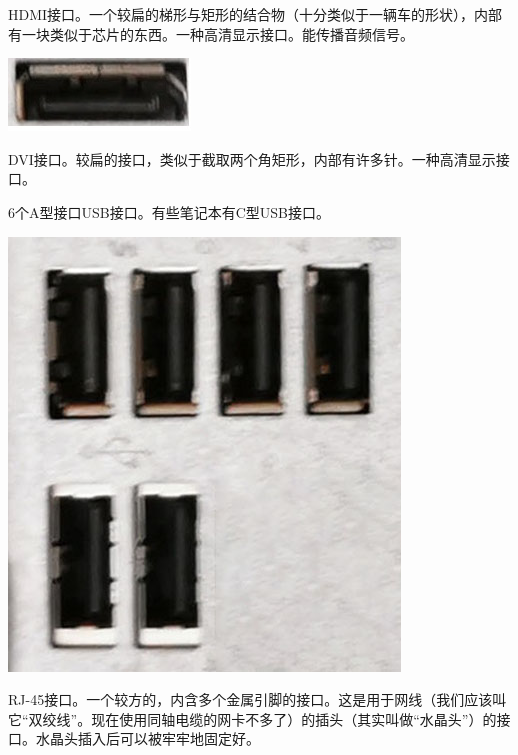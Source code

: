 HDMI接口。一个较扁的梯形与矩形的结合物（十分类似于一辆车的形状），内部有一块类似于芯片的东西。一种高清显示接口。能传播音频信号。
\begin{center}
	\includegraphics{pic/HDMI}
\end{center}\par
DVI接口。较扁的接口，类似于截取两个角矩形，内部有许多针。一种高清显示接口。\par
6个A型接口USB接口。有些笔记本有C型USB接口。
\begin{center}
	\includegraphics[scale=0.6]{pic/USB}
\end{center}\par
RJ-45接口。一个较方的，内含多个金属引脚的接口。这是用于网线（我们应该叫它“双绞线”。现在使用同轴电缆的网卡不多了）的插头（其实叫做“水晶头”）的接口。水晶头插入后可以被牢牢地固定好。
